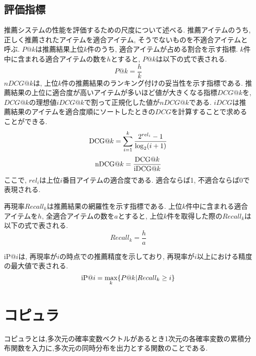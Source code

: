 \subsection{評価指標}
推薦システムの性能を評価するための尺度について述べる.
推薦アイテムのうち, 正しく推薦されたアイテムを適合アイテム, そうでないものを不適合アイテムと呼ぶ.
$P@k$は推薦結果上位$k$件のうち, 適合アイテムが占める割合を示す指標. $k$件中に含まれる適合アイテムの数を$h$とすると, $P@k$は以下の式で表される.
\begin{equation}
    \label{eq:pr}
    P@k = \frac{h}{k}
\end{equation}
$nDCG@k$は, 上位$k$件の推薦結果のランキング付けの妥当性を示す指標である.
推薦結果の上位に適合度が高いアイテムが多いほど値が大きくなる指標$DCG@k$を, $DCG@k$の理想値$iDCG@k$で割って正規化した値が$nDCG@k$である.
$iDCG$は推薦結果のアイテムを適合度順にソートしたときの$DCG$を計算することで求めることができる.
 \begin{equation}
   \centering
   \label{eq:dcg}
   \mathrm{DCG}@k = \sum_{i=1}^k\frac{2^{rel_i}-1}{\log_2(i+1)}
 \end{equation}
 \begin{equation}
   \centering
   \label{eq:nDCG}
   \mathrm{nDCG}@k = \frac{\mathrm{DCG}@k}{\mathrm{iDCG}@k}
 \end{equation}
 ここで, $rel_i$は上位$i$番目アイテムの適合度である. 適合ならば1, 不適合ならば0で表現される.

 再現率$Recall_k$は推薦結果の網羅性を示す指標である. 上位$k$件中に含まれる適合アイテムを$h$, 全適合アイテムの数を$a$とすると,
 上位$k$件を取得した際の$Recall_k$は以下の式で表される.
\begin{equation}
    \label{eq:recall}
	Recall_{k} = \frac{h}{a}
\end{equation}

 iP@$i$は, 再現率が$i$の時点での推薦精度を示しており, 再現率が$i$以上における精度の最大値で表される.
 \begin{equation}
   \centering
   \label{eq:ip}
   \mathrm{iP}@i = \max_{k} \{ P@k | Recall_k \geq i \}
 \end{equation}

\newpage
\section{コピュラ}
コピュラとは,多次元の確率変数ベクトルがあるとき1次元の各確率変数の累積分布関数を入力に,多次元の同時分布を出力とする関数のことである.
